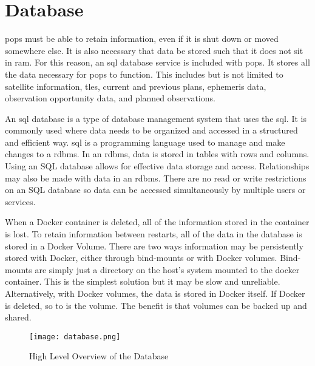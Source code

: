 
\section{Database}\label{sec:database}

\gls{pops} must be able to retain information, even if it is
shut down or moved somewhere else. It is also necessary that data be stored
such that it does not sit in \gls{ram}. For this reason, an \acrshort{sql}
database service is included with \gls{pops}. It stores all the data necessary
for \gls{pops} to function. This includes but is not limited to satellite
information, \glspl{tle}, current and previous plans, ephemeris data,
observation opportunity data, and planned observations. 

An \acrshort{sql} database is a type of database management system that uses
the \gls{sql}. It is commonly used where data needs to be organized and
accessed in a structured and efficient way. \gls{sql} is a programming language
used to manage and make changes to a \gls{rdbms}. In an \gls{rdbms}, data is
stored in tables with rows and columns. Using an SQL database allows for
effective data storage and access. Relationships may also be made with data in
an \gls{rdbms}. There are no read or write restrictions on an SQL database so
data can be accessed simultaneously by multiple users or services.

When a Docker container is deleted, all of the information stored in the
container is lost. To retain information between restarts, all of the data in
the database is stored in a Docker Volume. There are two ways information may
be persistently stored with Docker, either through bind-mounts or with Docker
volumes. Bind-mounts are simply just a directory on the host's system mounted
to the docker container. This is the simplest solution but it may be slow and
unreliable. Alternatively, with Docker volumes, the data is stored in Docker
itself. If Docker is deleted, so to is the volume. The benefit is that volumes
can be backed up and shared.

\begin{figure}
    \centering
    \texttt{[image: database.png]} 
    \caption{High Level Overview of the Database}
    \label{fig:database} 
\end{figure}

